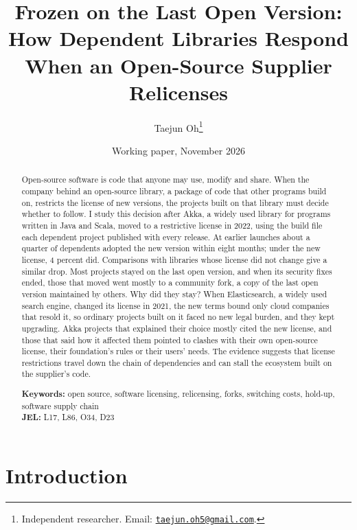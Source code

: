 \documentclass[11pt]{article}
\title{Frozen on the Last Open Version:\\ How Dependent Libraries Respond When an Open-Source Supplier Relicenses}
\author{Taejun Oh\thanks{Independent researcher. Email: \href{mailto:taejun.oh5@gmail.com}{\texttt{taejun.oh5@gmail.com}}.}}
\date{Working paper, November 2026}
\begin{document}
\maketitle

\begin{abstract}
\noindent Open-source software is code that anyone may use, modify and share. When the company behind an open-source library, a package of code that other programs build on, restricts the license of new versions, the projects built on that library must decide whether to follow. I study this decision after Akka, a widely used library for programs written in Java and Scala, moved to a restrictive license in 2022, using the build file each dependent project published with every release. At earlier launches about a quarter of dependents adopted the new version within eight months; under the new license, 4 percent did. Comparisons with libraries whose license did not change give a similar drop. Most projects stayed on the last open version, and when its security fixes ended, those that moved went mostly to a community fork, a copy of the last open version maintained by others. Why did they stay? When Elasticsearch, a widely used search engine, changed its license in 2021, the new terms bound only cloud companies that resold it, so ordinary projects built on it faced no new legal burden, and they kept upgrading. Akka projects that explained their choice mostly cited the new license, and those that said how it affected them pointed to clashes with their own open-source license, their foundation's rules or their users' needs. The evidence suggests that license restrictions travel down the chain of dependencies and can stall the ecosystem built on the supplier's code.

\medskip
\noindent\textbf{Keywords:} open source, software licensing, relicensing, forks, switching costs, hold-up, software supply chain\\
\noindent\textbf{JEL:} L17, L86, O34, D23
\end{abstract}

\newpage
\section{Introduction}
\end{document}
